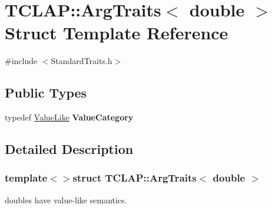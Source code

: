 \hypertarget{struct_t_c_l_a_p_1_1_arg_traits_3_01double_01_4}{\section{T\+C\+L\+A\+P\+:\+:Arg\+Traits$<$ double $>$ Struct Template Reference}
\label{struct_t_c_l_a_p_1_1_arg_traits_3_01double_01_4}
}


{\ttfamily \#include $<$Standard\+Traits.\+h$>$}

\subsection*{Public Types}
\begin{DoxyCompactItemize}
\item 
\hypertarget{struct_t_c_l_a_p_1_1_arg_traits_3_01double_01_4_a06ac5f8ebfcbc537e9ce57b96836dd3d}{typedef \hyperlink{struct_t_c_l_a_p_1_1_value_like}{Value\+Like} {\bfseries Value\+Category}}\label{struct_t_c_l_a_p_1_1_arg_traits_3_01double_01_4_a06ac5f8ebfcbc537e9ce57b96836dd3d}

\end{DoxyCompactItemize}


\subsection{Detailed Description}
\subsubsection*{template$<$$>$struct T\+C\+L\+A\+P\+::\+Arg\+Traits$<$ double $>$}

doubles have value-\/like semantics. 